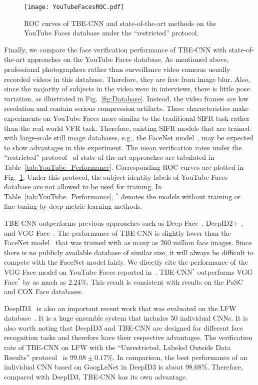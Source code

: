 \documentclass[10pt,journal,cspaper,compsoc]{IEEEtran}
\begin{document}
\begin{figure}
\centering
\texttt{[image: YouTubeFacesROC.pdf]}
\caption{ROC curves of TBE-CNN and state-of-the-art methods on the YouTube Faces database under the ``restricted'' protocol.
}
\label{fig:YouTubeFacesROC}
\end{figure}


Finally, we compare the face verification performance of TBE-CNN with state-of-the-art approaches on the YouTube Faces database.
As mentioned above, professional photographers rather than surveillance video cameras usually recorded videos in this database.
Therefore, they are free from image blur.
Also, since the majority of subjects in the video were in interviews, there is little pose variation, as illustrated in Fig.~\ref{fig:Database}.
Instead, the video frames are low resolution and contain serious compression artifacts.
These characteristics make experiments on YouTube Faces more similar to the traditional SIFR task rather than the real-world VFR task.
Therefore, existing SIFR models that are trained with large-scale still image databases,
e.g., the FaceNet model~\cite{schroff2015facenet}, may be expected to show advantages in this experiment.
The mean verification rates under the ``restricted'' protocol~\cite{wolf2011face} of state-of-the-art approaches are tabulated in Table~\ref{tab:YouTube_Performance}.
Corresponding ROC curves are plotted in Fig.~\ref{fig:YouTubeFacesROC}.
Under this protocol, the subject identity labels of YouTube Faces database are not allowed to be used for training.
In Table~\ref{tab:YouTube_Performance}, $^*$ denotes the models without training or fine-tuning by deep metric learning methods.

TBE-CNN outperforms previous approaches such as Deep Face~\cite{taigman2014deepface}, DeepID2+~\cite{sun2015deeply}, and VGG Face~\cite{parkhi2015deep}.
The performance of TBE-CNN is slightly lower than the FaceNet model~\cite{schroff2015facenet} that was trained with as many as 260 million face images.
Since there is no publicly available database of similar size, it will always be difficult to compete with the FaceNet model fairly.
We directly cite the performance of the VGG Face model on YouTube Faces reported in~\cite{parkhi2015deep}.
TBE-CNN$^*$ outperforms VGG Face$^*$ by as much as 2.24\%.
This result is consistent with results on the PaSC and COX Face databases.

DeepID3~\cite{sun2015deepid3} is also an important recent work that was evaluated on the LFW database~\cite{LFWTech}.
It is a huge ensemble system that includes 50 individual CNNs.
It is also worth noting that DeepID3 and TBE-CNN are designed for different face recognition tasks and therefore have their respective advantages.
The verification rate of TBE-CNN on LFW with the ``Unrestricted, Labeled Outside Data Results'' protocol~\cite{LFWTech} is $99.08\pm0.17\%$.
In comparison, the best performance of an individual CNN based on GoogLeNet in DeepID3 is about 98.68\%.
Therefore, compared with DeepID3, TBE-CNN has its own advantage.
\end{document}
